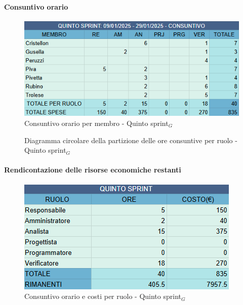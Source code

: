 \documentclass[10pt]{article}
\begin{document}
{{{{{{    \paragraph{Consuntivo orario}\mbox{}\vspace{0.4em}
    \begin{figure}[ht]
    	\centering
    	\includegraphics[width=0.6\linewidth]{consuntivoOreQuintoSprint.png}
    	\caption{Consuntivo orario per membro - Quinto sprint$_G$}
    	\label{fig:Consuntivo orario per membro - quinto sprint$_G$}
    \end{figure}

    \begin{figure}[H]
        \centering
        \caption{Diagramma circolare della partizione delle ore consuntive per ruolo - Quinto sprint$_G$ }
        \label{fig:Diagramma circolare della partizione delle ore consuntive per ruolo - Quinto sprint$_G$}
    \end{figure}

    \paragraph{Rendicontazione delle risorse economiche restanti}\mbox{}\vspace{0.4em}
    \begin{figure}[H]
    	\centering
    	\includegraphics[width=0.6\linewidth]{oreCostiQuintoSprint.png}
    	\caption{Consuntivo orario e costi per ruolo - Quinto sprint$_G$}
    	\label{fig:Consuntivo orario e costi per ruolo - Quinto sprint$_G$}
    \end{figure}
    
}}}}}}
\end{document}
